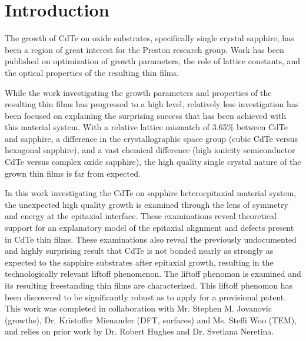 \section{Introduction}
The growth of CdTe on oxide substrates, specifically single crystal sapphire, has been a 
region of great interest for the Preston research group. Work has been published on 
optimization of growth parameters, the role of lattice constants, and the optical 
properties of the resulting thin films\cite{Neretina2009a,Neretina2008b,Neretina2009b,Neretina2007,Neretina2006,cdte-optical}.

While the work investigating the growth parameters and properties of the resulting thin 
films has progressed to a high level, relatively less investigation has been focused on 
explaining the surprising success that has been achieved with this material system. With 
a relative lattice mismatch of 3.65\% between CdTe and sapphire, a difference in the 
crystallographic space group (cubic CdTe versus hexagonal sapphire), and a vast chemical 
difference (high ionicity semiconductor CdTe versus complex oxide sapphire), the high 
quality single crystal nature of the grown thin films is far from expected.

In this work investigating the CdTe on sapphire heteroepitaxial material system, the 
unexpected high quality growth is examined through the lens of symmetry and energy at the 
epitaxial 
interface. These examinations reveal theoretical support for an explanatory model of the 
epitaxial alignment 
and defects present in CdTe thin films. These examinations also reveal the previously 
undocumented and highly surprising result that CdTe is not bonded nearly as strongly as 
expected to the sapphire substrates after epitaxial growth, resulting in the 
technologically relevant liftoff phenomenon. The liftoff phenomon is examined and its 
resulting freestanding thin films are characterized. This liftoff phenomon has been 
discovered to be significantly robust as to apply for a provisional patent\cite{patent}. 
This work was completed in collaboration 
with Mr. Stephen M. Jovanovic (growths), Dr. Kristoffer Mienander (DFT, surfaces) and Ms. 
Steffi Woo (TEM), and relies on prior work by Dr. Robert Hughes and Dr. Svetlana Neretina.

